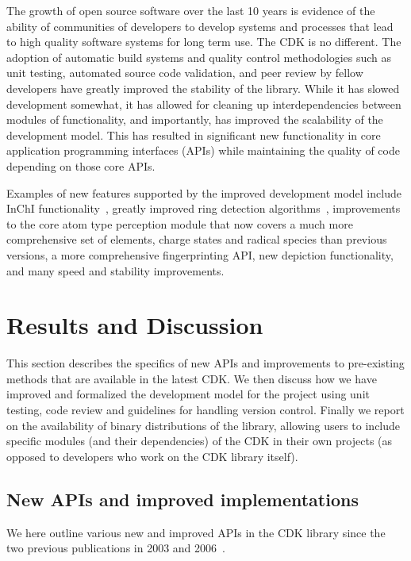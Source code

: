 \documentclass[10pt]{bmcart}
\begin{document}
The growth of open source software over the last 10 years is evidence           %
of the ability of communities of developers to develop systems and
processes that lead to high quality software systems for long term
use. The CDK is no different. The adoption of automatic build systems
and quality control methodologies such as unit testing, automated
source code validation, and peer review by fellow developers have
greatly improved the stability of the library. While it has slowed
development somewhat, it has allowed for cleaning up interdependencies
between modules of functionality, and importantly, has improved the scalability
of the development model.  This has resulted in significant new
functionality in core application programming interfaces (APIs)
while maintaining the quality of code depending on those core APIs.

Examples of new features supported by the improved development model
include InChI functionality~\cite{Spjuth2013}, greatly improved ring
detection algorithms~\cite{May2014}, improvements to the core atom
type perception module that now covers a much more comprehensive set
of elements, charge states and radical species than previous versions,
a more comprehensive fingerprinting API, new depiction functionality,
and many speed and stability improvements.

\section*{Results and Discussion}

This section describes the specifics of new APIs and
improvements to pre-existing methods that are available in the latest
CDK.  We then discuss how we have improved and formalized the
development model for the project using unit testing, code review and
guidelines for handling version control. Finally we report on the
availability of binary distributions of the library, allowing users to
include specific modules (and their dependencies) of the CDK in their
own projects (as opposed to developers who work on the CDK library
itself).

\subsection*{New APIs and improved implementations}

We here outline various new and improved APIs in the CDK library since the
two previous publications in 2003 and 2006~\cite{Steinbeck2003,Steinbeck2006}.
\end{document}
